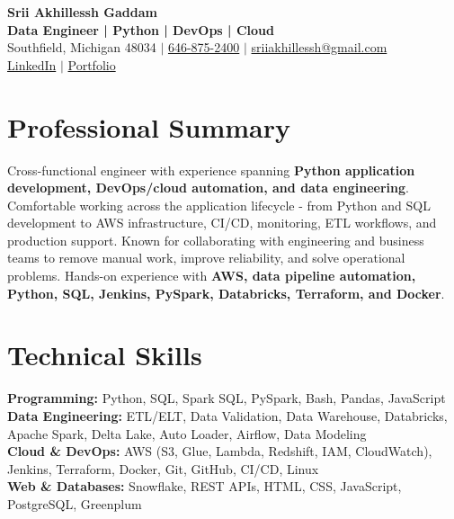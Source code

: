 \documentclass[letterpaper,10pt]{article}
\begin{document}
\fontsize{9.35pt}{10.45pt}\selectfont

\begin{center}
    {\LARGE \textbf{Srii Akhillessh Gaddam}} \\[-1pt]
    \textbf{Data Engineer | Python | DevOps | Cloud} \\[2pt]
    Southfield, Michigan 48034 $|$
    \href{tel:6468752400}{646-875-2400} $|$
    \href{mailto:sriiakhillessh@gmail.com}{sriiakhillessh@gmail.com} \\[1pt]
    \href{https://www.linkedin.com/in/srii-akhiilessh-gaddam-b48668191/}{LinkedIn} $|$
    \href{https://sriiakhillesshg.github.io/portfolio/}{Portfolio}
\end{center}
\vspace{-8pt}

\section{Professional Summary}
\small{Cross-functional engineer with experience spanning \textbf{Python application development, DevOps/cloud automation, and data engineering}. Comfortable working across the application lifecycle - from Python and SQL development to AWS infrastructure, CI/CD, monitoring, ETL workflows, and production support. Known for collaborating with engineering and business teams to remove manual work, improve reliability, and solve operational problems. Hands-on experience with \textbf{AWS, data pipeline automation, Python, SQL, Jenkins, PySpark, Databricks, Terraform, and Docker}.}

\section{Technical Skills}
\small{
\textbf{Programming:} Python, SQL, Spark SQL, PySpark, Bash, Pandas, JavaScript \\
\textbf{Data Engineering:} ETL/ELT, Data Validation, Data Warehouse, Databricks, Apache Spark, Delta Lake, Auto Loader, Airflow, Data Modeling \\
\textbf{Cloud \& DevOps:} AWS (S3, Glue, Lambda, Redshift, IAM, CloudWatch), Jenkins, Terraform, Docker, Git, GitHub, CI/CD, Linux \\
\textbf{Web \& Databases:} Snowflake, REST APIs, HTML, CSS, JavaScript, PostgreSQL, Greenplum
}
\end{document}
